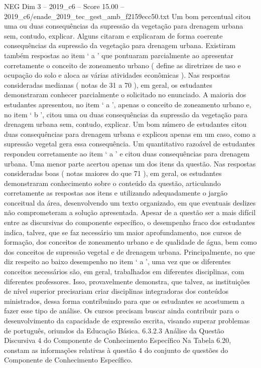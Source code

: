 \begin{textsample}{NEG Dim 3 – 2019\_c6 – Score 15.00 – 2019\_c6/enade\_2019\_tec\_gest\_amb\_f2159ecc50.txt}
Um bom percentual citou uma ou duas consequências da supressão da vegetação para drenagem urbana sem, contudo, explicar.
Alguns citaram e explicaram de forma coerente consequências da supressão da vegetação para drenagem urbana.
Existiram também respostas ao item ‘ a ’ que pontuaram parcialmente ao apresentar corretamente o conceito de zoneamento urbano ( define as diretrizes de uso e ocupação do solo e aloca as várias atividades econômicas ).
Nas respostas consideradas medianas ( notas de 31 a 70 ), em geral, os estudantes demonstraram conhecer parcialmente o solicitado no enunciado.
A maioria dos estudantes apresentou, no item ‘ a ’, apenas o conceito de zoneamento urbano e, no item ‘ b ’, citou uma ou duas consequências da supressão da vegetação para drenagem urbana sem, contudo, explicar.
Um bom número de estudantes citou duas consequências para drenagem urbana e explicou apenas em um caso, como a supressão vegetal gera essa consequência.
Um quantitativo razoável de estudantes respondeu corretamente ao item ‘ a ’ e citou duas consequências para drenagem urbana.
Uma menor parte acertou apenas um dos itens da questão.
Nas respostas consideradas boas ( notas maiores do que 71 ), em geral, os estudantes demonstraram conhecimento sobre o conteúdo da questão, articulando corretamente as respostas aos itens e utilizando adequadamente o jargão conceitual da área, desenvolvendo um texto organizado, em que eventuais deslizes não comprometeram a solução apresentada.
Apesar de a questão ser a mais difícil entre as discursivas do componente específico, o desempenho fraco dos estudantes indica, talvez, que se faz necessário um maior aprofundamento, nos cursos de formação, dos conceitos de zoneamento urbano e de qualidade de água, bem como dos conceitos de supressão vegetal e de drenagem urbana.
Principalmente, no que diz respeito ao baixo desempenho no item ‘ a ’, uma vez que os diferentes conceitos necessários são, em geral, trabalhados em diferentes disciplinas, com diferentes professores.
Isso, provavelmente demonstra, que talvez, as instituições de nível superior precisariam criar disciplinas integradoras dos conteúdos ministrados, dessa forma contribuindo para que os estudantes se acostumem a fazer esse tipo de análise.
Os cursos precisam buscar ainda contribuir para o desenvolvimento da capacidade de expressão escrita, visando superar problemas de português, oriundos da Educação Básica. 6.3.2.3 Análise da Questão Discursiva 4 do Componente de Conhecimento Específico Na Tabela 6.20, constam as informações relativas à questão 4 do conjunto de questões do Componente de Conhecimento Específico.

\end{textsample}
